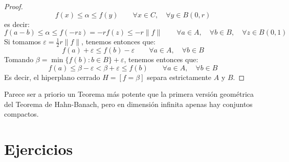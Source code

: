 \begin{teo}
\begin{proof}
        \begin{equation*}
            f(x) \leq \alpha \leq f(y) \qquad \forall x\in C, \quad \forall y\in B(0,r)
        \end{equation*}
        es decir:
        \begin{equation*}
            f(a-b) \leq \alpha \leq f(-rz) = -rf(z) \leq -r\|f\| \qquad \forall a\in A, \quad \forall b\in B, \quad \forall z\in B(0,1)
        \end{equation*}
        Si tomamos $\varepsilon=\frac{1}{2}r\|f\|$, tenemos entonces que:
        \begin{equation*}
            f(a) + \varepsilon\leq f(b) - \varepsilon\qquad \forall a\in A, \quad \forall b\in B
        \end{equation*}
        Tomando $\beta = \min\{f(b) : b\in B\}+\varepsilon$, tenemos entonces que:
        \begin{equation*}
            f(a) \leq \beta - \varepsilon < \beta + \varepsilon \leq f(b) \qquad \forall a\in A, \quad \forall b\in B
        \end{equation*}
        Es decir, el hiperplano cerrado $H=[f=\beta]$ separa estrictamente $A$ y $B$.
    \end{proof}
\end{teo}

\noindent
Parece ser a priorio un Teorema más potente que la primera versión geométrica del Teorema de Hahn-Banach, pero en dimensión infinita apenas hay conjuntos compactos.

\section{Ejercicios}

